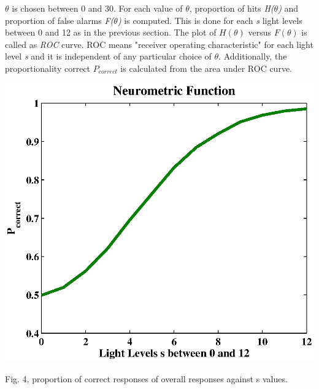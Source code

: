 \documentclass{article}
\begin{document}
$\theta$ is chosen between 0 and 30. For each value of $\theta$, proportion of hits \textit{H($\theta$)} and proportion of false alarms \textit{F($\theta$)} is computed. This is done for each \textit{s} light levels between 0 and 12 as in the previous section. The plot of $H(\theta)$ versus $F(\theta)$ is called as \textit{ROC} curve. ROC means "receiver operating characteristic" for each light level \textit{s} and it is independent of any particular choice of $\theta$. Additionally, the proportionality correct \textit{$P_{correct}$} is calculated from the area under ROC curve. \\


 \begin{center}
 \includegraphics[width=\textwidth]{p_correct.eps}
\begin{footnotesize} Fig. 4, proportion of correct responses of overall responses against s values. 
\end{footnotesize}
\end{center} 
\end{document}
